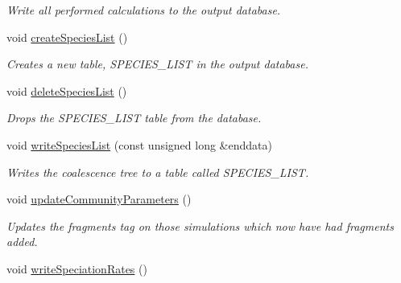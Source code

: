 \begin{DoxyCompactItemize}
\begin{DoxyCompactList}\small\item\em Write all performed calculations to the output database. \end{DoxyCompactList}\item 
void \hyperlink{class_community_a8e24ae85544e1d500f8dca64c9b99e0e}{create\+Species\+List} ()\hypertarget{class_community_a8e24ae85544e1d500f8dca64c9b99e0e}{}\label{class_community_a8e24ae85544e1d500f8dca64c9b99e0e}

\begin{DoxyCompactList}\small\item\em Creates a new table, S\+P\+E\+C\+I\+E\+S\+\_\+\+L\+I\+ST in the output database. \end{DoxyCompactList}\item 
void \hyperlink{class_community_a9af4bdfd482ec50025c9182a32fd488c}{delete\+Species\+List} ()\hypertarget{class_community_a9af4bdfd482ec50025c9182a32fd488c}{}\label{class_community_a9af4bdfd482ec50025c9182a32fd488c}

\begin{DoxyCompactList}\small\item\em Drops the S\+P\+E\+C\+I\+E\+S\+\_\+\+L\+I\+ST table from the database. \end{DoxyCompactList}\item 
void \hyperlink{class_community_a7c265ac505505f65c92725ff4cd39094}{write\+Species\+List} (const unsigned long \&enddata)\hypertarget{class_community_a7c265ac505505f65c92725ff4cd39094}{}\label{class_community_a7c265ac505505f65c92725ff4cd39094}

\begin{DoxyCompactList}\small\item\em Writes the coalescence tree to a table called S\+P\+E\+C\+I\+E\+S\+\_\+\+L\+I\+ST. \end{DoxyCompactList}\item 
void \hyperlink{class_community_af3f5939bfb59fdf3b7d7b5f3699bd225}{update\+Community\+Parameters} ()\hypertarget{class_community_af3f5939bfb59fdf3b7d7b5f3699bd225}{}\label{class_community_af3f5939bfb59fdf3b7d7b5f3699bd225}

\begin{DoxyCompactList}\small\item\em Updates the fragments tag on those simulations which now have had fragments added. \end{DoxyCompactList}\item 
void \hyperlink{class_community_adcfc04e92cbb597682dcc1f2913d6668}{write\+Speciation\+Rates} ()\hypertarget{class_community_adcfc04e92cbb597682dcc1f2913d6668}{}\label{class_community_adcfc04e92cbb597682dcc1f2913d6668}


\end{DoxyCompactItemize}

